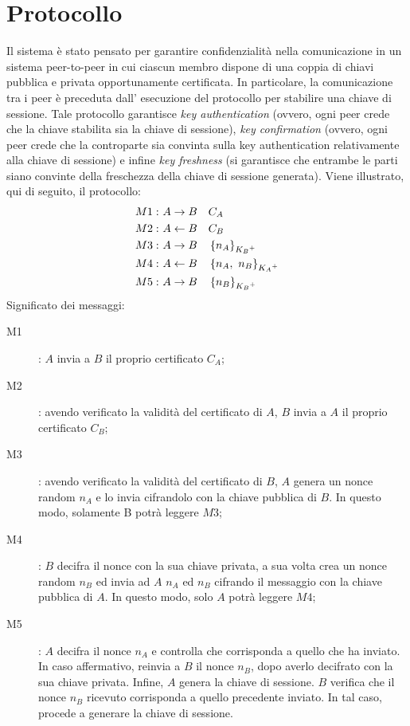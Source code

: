 \chapter{Protocollo}
\label{chap:protocollo}
	Il sistema è stato pensato per garantire confidenzialità nella comunicazione in un sistema 
	peer-to-peer in cui ciascun membro dispone di una coppia di chiavi pubblica e privata 
	opportunamente certificata. In particolare, la comunicazione tra i peer è preceduta dall' 
	esecuzione del protocollo per stabilire una chiave di sessione. Tale protocollo garantisce 
	\emph{key authentication} (ovvero, ogni peer crede che la chiave stabilita sia la chiave
	di sessione), \emph{key confirmation} (ovvero, ogni peer crede che la controparte sia
	convinta sulla key authentication relativamente alla chiave di sessione) e infine
	\emph{key freshness} (si garantisce che entrambe le parti siano convinte della freschezza
	della chiave di sessione generata).
	Viene illustrato, qui di seguito, il protocollo:
	\[
		\begin{aligned}
			M1:\ & A \rightarrow B & & C_A\\
			M2:\ & A \leftarrow B & & C_B\\
			M3:\ & A \rightarrow B & & \encrypt{n_A}{\publickey{B}}\\
			M4:\ & A \leftarrow B & & \encrypt{n_A,\ n_B}{\publickey{A}}\\
			M5:\ & A \rightarrow B & & \encrypt{n_B}{\publickey{B}}\\
		\end{aligned}
	\]
	Significato dei messaggi:
	\begin{description}
		\item[M1]: $A$ invia a $B$ il proprio certificato $C_A$;
		\item[M2]: avendo verificato la validità del certificato di $A$, $B$ invia a $A$ il proprio certificato $C_B$;
		\item[M3]: avendo verificato la validità del certificato di $B$, $A$ genera un nonce random $n_A$ e lo invia
		cifrandolo con la chiave pubblica di $B$. In questo modo, solamente B potrà leggere $M3$;
		\item[M4]: $B$ decifra il nonce con la sua chiave privata, a sua volta crea un nonce random $n_B$ ed invia
		ad $A$ $n_A$ ed $n_B$ cifrando il messaggio con la chiave pubblica di $A$. In questo modo, solo $A$ potrà 
		leggere $M4$;
		\item[M5]: $A$ decifra il nonce $n_A$ e controlla che corrisponda a quello che ha inviato. In caso affermativo,
		reinvia a $B$ il nonce $n_B$, dopo averlo decifrato con la sua chiave privata. Infine, $A$ genera la chiave di sessione.
		$B$ verifica che il nonce $n_B$ ricevuto corrisponda a quello precedente inviato. In tal caso, procede a generare la chiave di sessione.
	\end{description}

